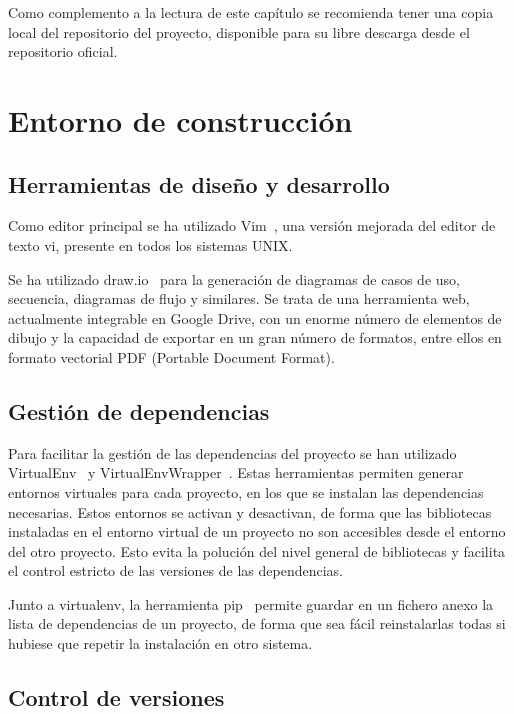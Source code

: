 Como complemento a la lectura de este capítulo se recomienda tener una copia
local del repositorio del proyecto, disponible para su libre descarga desde
el repositorio oficial.

\section{Entorno de construcción}

\subsection{Herramientas de diseño y desarrollo}

Como editor principal se ha utilizado Vim~\cite{vim}, una versión mejorada del editor de
texto vi, presente en todos los sistemas UNIX.

Se ha utilizado draw.io~\cite{draw.io} para la generación de diagramas de casos de uso,
secuencia, diagramas de flujo y similares. Se trata de una herramienta web, 
actualmente integrable en Google Drive, con un enorme número de elementos de
dibujo y la capacidad de exportar en un gran número de formatos, entre ellos en
formato vectorial PDF (Portable Document Format).

\subsection{Gestión de dependencias}

Para facilitar la gestión de las dependencias del proyecto se han utilizado VirtualEnv~\cite{virtualenv}
y VirtualEnvWrapper~\cite{virtualenvwrapper}. Estas herramientas permiten generar
entornos virtuales para cada proyecto, en los que se instalan las dependencias necesarias.
Estos entornos se activan y desactivan, de forma que las bibliotecas instaladas en
el entorno virtual de un proyecto no son accesibles desde el entorno del
otro proyecto. Esto evita la polución del nivel general de bibliotecas y facilita el
control estricto de las versiones de las dependencias.

Junto a virtualenv, la herramienta pip~\cite{pip} permite guardar en un fichero anexo
la lista de dependencias de un proyecto, de forma que sea fácil reinstalarlas todas
si hubiese que repetir la instalación en otro sistema.

\subsection{Control de versiones}

